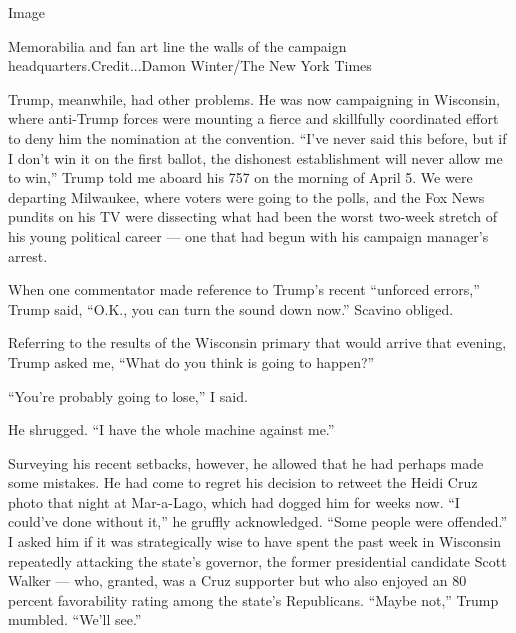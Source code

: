 Image

Memorabilia and fan art line the walls of the campaign
headquarters.Credit...Damon Winter/The New York Times

Trump, meanwhile, had other problems. He was now campaigning in
Wisconsin, where anti-Trump forces were mounting a fierce and skillfully
coordinated effort to deny him the nomination at the convention. ``I've
never said this before, but if I don't win it on the first ballot, the
dishonest establishment will never allow me to win,'' Trump told me
aboard his 757 on the morning of April 5. We were departing Milwaukee,
where voters were going to the polls, and the Fox News pundits on his TV
were dissecting what had been the worst two-week stretch of his young
political career --- one that had begun with his campaign manager's
arrest.

When one commentator made reference to Trump's recent ``unforced
errors,'' Trump said, ``O.K., you can turn the sound down now.'' Scavino
obliged.

Referring to the results of the Wisconsin primary that would arrive that
evening, Trump asked me, ``What do you think is going to happen?''

``You're probably going to lose,'' I said.

He shrugged. ``I have the whole machine against me.''

Surveying his recent setbacks, however, he allowed that he had perhaps
made some mistakes. He had come to regret his decision to retweet the
Heidi Cruz photo that night at Mar-a-Lago, which had dogged him for
weeks now. ``I could've done without it,'' he gruffly acknowledged.
``Some people were offended.'' I asked him if it was strategically wise
to have spent the past week in Wisconsin repeatedly attacking the
state's governor, the former presidential candidate Scott Walker ---
who, granted, was a Cruz supporter but who also enjoyed an 80 percent
favorability rating among the state's Republicans. ``Maybe not,'' Trump
mumbled. ``We'll see.''

